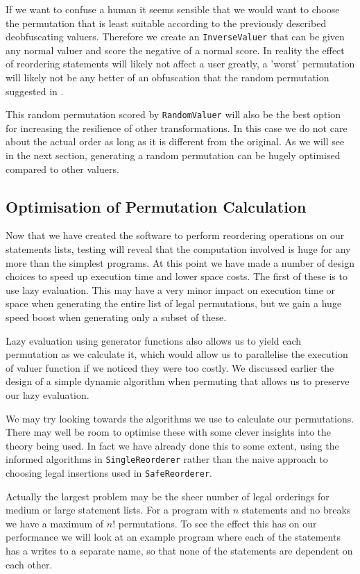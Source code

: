 \documentclass[twoside,a4paper]{report}
\begin{document}
If we want to confuse a human it seems sensible that we would want to choose the permutation that is least suitable according to the previously described
deobfuscating valuers. Therefore we create an \texttt{InverseValuer} that can be given any normal valuer and score the negative of a normal score. In
reality the effect of reordering statements will likely not affect a user greatly, a 'worst' permutation will likely not be any better of an obfuscation
that the random permutation suggested in \cite{taxobftrans}.

This random permutation scored by \texttt{RandomValuer} will also be the best option for increasing the resilience of other transformations. In this case we
do not care about the actual order as long as it is different from the original. As we will see in the next section, generating a random permutation can
be hugely optimised compared to other valuers.

\subsection{Optimisation of Permutation Calculation}

Now that we have created the software to perform reordering operations on our statements lists, testing will reveal that the computation involved is huge
for any more than the simplest programs. At this point we have made a number of design choices to speed up execution time and lower space costs. The first
of these is to use lazy evaluation. This may have a very minor impact on execution time or space when generating the entire list of legal permutations, but
we gain a huge speed boost when generating only a subset of these.

Lazy evaluation using generator functions also allows us to yield each permutation as we calculate it, which would allow us to parallelise the execution of valuer
function if we noticed they were too costly. We discussed earlier the design of a simple dynamic algorithm when permuting that allows us to preserve our lazy
evaluation.

We may try looking towards the algorithms we use to calculate our permutations. There may well be room to optimise these with some clever insights into
the theory being used. In fact we have already done this to some extent, using the informed algorithms in \texttt{SingleReorderer} rather than the naive
approach to choosing legal insertions used in \texttt{SafeReorderer}.

Actually the largest problem may be the sheer number of legal orderings for medium or large statement lists. For a program with $n$ statements and no breaks
we have a maximum of $n!$ permutations. To see the effect this has on our performance we will look at an example program where each of the statements has a
writes to a separate name, so that none of the statements are dependent on each other.
\end{document}
